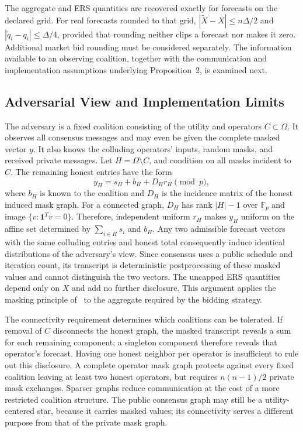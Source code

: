 \documentclass[journal]{IEEEtran}
\newcommand{\one}{\mathbf{1}}
\begin{document}
The aggregate and ERS quantities are recovered exactly for forecasts on the declared grid. For real forecasts rounded to that grid, $|\widetilde X-X|\leq n\Delta/2$ and $|\widetilde q_i-q_i|\leq\Delta/4$, provided that rounding neither clips a forecast nor makes it zero. Additional market bid rounding must be considered separately. The information available to an observing coalition, together with the communication and implementation assumptions underlying Proposition~2, is examined next.

\subsection{Adversarial View and Implementation Limits}

The adversary is a fixed coalition consisting of the utility and operators $C\subset\Omega$. It observes all consensus messages and may even be given the complete masked vector $y$. It also knows the colluding operators' inputs, random masks, and received private messages. Let $H=\Omega\setminus C$, and condition on all masks incident to $C$. The remaining honest entries have the form
\begin{equation}
 y_H=s_H+b_H+D_Hr_H\pmod p, \label{eq:honest_mask_view}
\end{equation}
where $b_H$ is known to the coalition and $D_H$ is the incidence matrix of the honest induced mask graph. For a connected graph, $D_H$ has rank $|H|-1$ over $\mathbb F_p$ and image $\{v:\one^Tv=0\}$. Therefore, independent uniform $r_H$ makes $y_H$ uniform on the affine set determined by $\sum_{i\in H}s_i$ and $b_H$. Any two admissible forecast vectors with the same colluding entries and honest total consequently induce identical distributions of the adversary's view. Since consensus uses a public schedule and iteration count, its transcript is deterministic postprocessing of these masked values and cannot distinguish the two vectors. The uncapped ERS quantities depend only on $X$ and add no further disclosure. This argument applies the masking principle of~\cite{Gupta2020PrivateConsensus} to the aggregate required by the bidding strategy.

The connectivity requirement determines which coalitions can be tolerated. If removal of $C$ disconnects the honest graph, the masked transcript reveals a sum for each remaining component; a singleton component therefore reveals that operator's forecast. Having one honest neighbor per operator is insufficient to rule out this disclosure. A complete operator mask graph protects against every fixed coalition leaving at least two honest operators, but requires $n(n-1)/2$ private mask exchanges. Sparser graphs reduce communication at the cost of a more restricted coalition structure. The public consensus graph may still be a utility-centered star, because it carries masked values; its connectivity serves a different purpose from that of the private mask graph.
\end{document}
